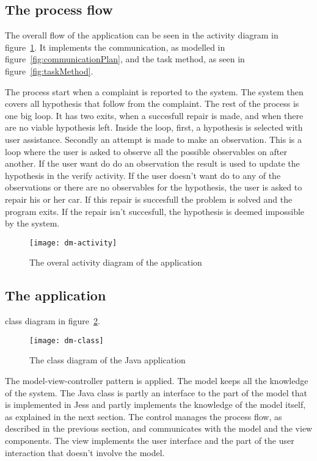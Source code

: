 \subsection{The process flow}
\label{sec:flow}

The overall flow of the application can be seen in the activity diagram in
figure~\ref{fig:dm:activity diagram}. It implements the communication, as
modelled in figure~\ref{fig:communicationPlan}, and the task method, as seen in
figure~\ref{fig:taskMethod}.

The process start when a complaint is reported to the system. The system then covers
all hypothesis that follow from the complaint. The rest of the process is one
big loop. It has two exits, when a succesfull repair is made, and when there are
no viable hypothesis left. Inside the loop, first, a hypothesis is selected with
user assistance. Secondly an attempt is made to make an observation. This is a
loop where the user is asked to observe all the possible observables on after
another. If the user want do do an observation the result is used to update the
hypothesis in the verify activity. If the user doesn't want do to any of the
observations or there are no observables for the hypothesis, the user is asked
to repair his or her car. If this repair is succesfull the problem is solved and
the program exits. If the repair isn't succesfull, the hypothesis is deemed
impossible by the system.

\begin{figure}[htbp]
    \centering
    \texttt{[image: dm-activity]}
    \caption{The overal activity diagram of the application}
    \label{fig:dm:activity diagram}
\end{figure}

\subsection{The application}
\label{sec:app}

class diagram in figure~\ref{fig:dm:class diagram}. %
\begin{figure}[htbp]
    \centering
    \texttt{[image: dm-class]}
    \caption{The class diagram of the Java application}
    \label{fig:dm:class diagram}
\end{figure}

The model-view-controller pattern is applied. The model keeps all the knowledge
of the system. The Java class is partly an interface to the part of the model
that is implemented in Jess and partly implements the knowledge of the model
itself, as explained in the next section. The control manages the process flow,
as described in the previous section, and communicates with the model and the
view components. The view implements the user interface and the part of the user
interaction that doesn't involve the model.

